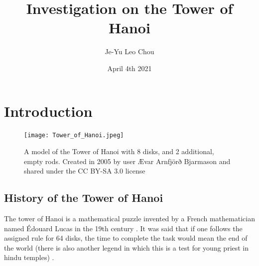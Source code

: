 \documentclass[12pt,a4paper]{article}
\title{Investigation on the Tower of Hanoi}
\author{Je-Yu Leo Chou }
\date{April 4th 2021}
\begin{document}
	\maketitle
	\tableofcontents
	\section{Introduction}
	\begin{figure}[ht]
		\begin{center}
			\texttt{[image: Tower\_of\_Hanoi.jpeg]}
			\caption{A model of the Tower of Hanoi with 8 disks, and 2 additional, empty rods. Created in 2005 by user Ævar Arnfjörð Bjarmason and shared under the CC BY-SA 3.0 license}
		\end{center}
	\end{figure}
	\subsection{History of the Tower of Hanoi}
	The tower of Hanoi is a mathematical puzzle invented by a French mathematician named Édouard Lucas in the 19th century \cite{Buddies}. It was said that if one follows the assigned rule for 64 disks, the time to complete the task would mean the end of the world (there is also another legend in which this is  a test for young priest in hindu temples) \cite{Buddies}.
\end{document}
